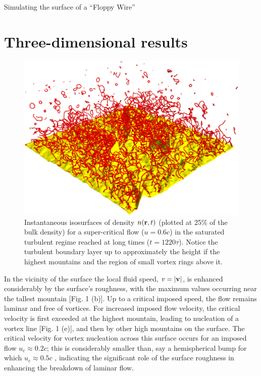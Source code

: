 \begin{chapter}{\label{cha:afm}Simulating the surface of a ``Floppy Wire''}
\section{Three-dimensional results}
\begin{figure}
\centering
{}%
\includegraphics[width=0.5\linewidth]{./afm/fig2-2b}%
\caption{Instantaneous isosurfaces of density $n({\bf r},t)$ 
(plotted at 25\%  of the bulk density) for a super-critical flow ($u=0.6 c$) in the saturated 
turbulent regime reached at long times ($t=1220 \tau$).  Notice the turbulent boundary layer up to
approximately the height if the highest mountains and the region
of small vortex rings above it.}
\label{fig2}
\end{figure}  
{In the vicinity of the surface the local fluid speed}, $v=|{\bf v}|$, 
is enhanced considerably by the {surface's} roughness, 
with the maximum values occurring near the tallest mountain [Fig. 1 (b)].   Up to a critical imposed speed, the flow remains laminar and free of vortices.  For increased imposed flow velocity, the critical velocity is first exceeded at the highest mountain, leading to nucleation of a vortex line [Fig. 1 (e)], and then by other high mountains on the surface.  The critical velocity for vortex nucleation across this surface occurs for an imposed flow $u_c\approx 0.2 c$; this is considerably smaller than, say a hemispherical bump for which $u_c \approx 0.5 c$ \cite{winiecki},  indicating the significant role of the surface roughness in enhancing the breakdown of laminar flow.  


\end{chapter}
